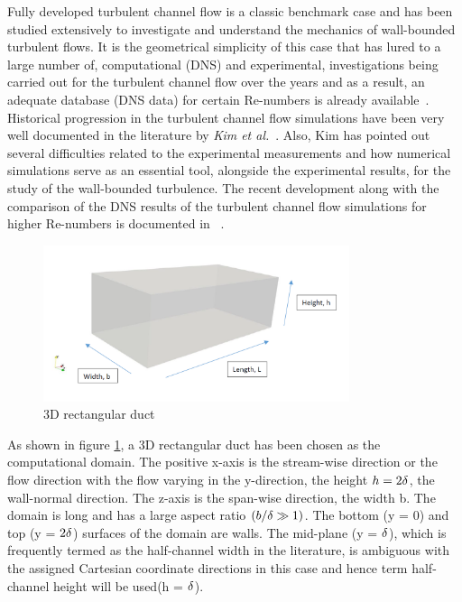 Fully developed turbulent channel flow is a classic benchmark case and has been studied extensively to investigate and understand the mechanics of wall-bounded turbulent flows. It is the geometrical simplicity of this case that has lured to a large number of, computational (DNS) and experimental, investigations being carried out for the turbulent channel flow over the years and as a result, an adequate database (DNS data) for certain Re-numbers is already available~\cite{channeldata:99}. Historical progression in the turbulent channel flow simulations have been very well documented in the literature by \emph{Kim et al.}~\cite{kim:moin:moser:87}. Also, Kim has pointed out several difficulties related to the experimental measurements and how numerical simulations serve as an essential tool, alongside the experimental results, for the study of the wall-bounded turbulence. The recent development along with the comparison of the DNS results of the turbulent channel flow simulations for higher Re-numbers is documented in ~\cite{lee:moser:15}.\\
%
\begin{figure}[h]
    \centering
    \includegraphics[width=0.8\textwidth]{figur/3D_Domain.png}
    \caption{3D rectangular duct}
    \label{3D domain}
\end{figure}
%
As shown in figure \ref{3D domain}, a 3D rectangular duct has been chosen as the computational domain. The positive x-axis is the stream-wise direction or the flow direction with the flow varying in the y-direction, the height $h = 2\delta$, the wall-normal direction. The z-axis is the span-wise direction, the width b. The domain is long and has a large aspect ratio $\left(b/\delta \gg 1\right)$. The bottom (y = 0) and top (y = $2\delta$) surfaces of the domain are walls. The mid-plane (y = $\delta$), which is frequently termed as the half-channel width in the literature, is ambiguous with the assigned Cartesian coordinate directions in this case and hence term half-channel height will be used(h = $\delta$). 

